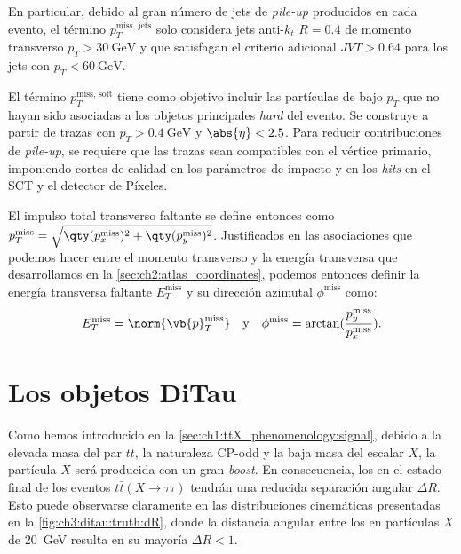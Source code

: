 En particular, debido al gran número de jets de \textit{pile-up} producidos en cada evento, el término $p_T^{\text{miss, jets}}$ solo considera jets anti-$k_t$ $R = 0.4$ de momento transverso $p_T > \SI{30}{\GeV}$ y que satisfagan el criterio adicional $JVT > 0.64$ para los jets con $p_T < \SI{60}{\GeV}$.

El término $p_T^{\text{miss, soft}}$ tiene como objetivo incluir las partículas de bajo $p_T$ que no hayan sido asociadas a los objetos principales \textit{hard} del evento. Se construye a partir de trazas con $p_T > \SI{0.4}{\GeV}$ y $\abs{\eta} < 2.5$. Para reducir contribuciones de \textit{pile-up}, se requiere que las trazas sean compatibles con el vértice primario, imponiendo cortes de calidad en los parámetros de impacto y en los \textit{hits} en el SCT y el detector de Píxeles.

El impulso total transverso faltante se define entonces como $p_T^{\text{miss}} = \sqrt{\qty(p_x^{\text{miss}})^2 + \qty(p_y^{\text{miss}})^2}$. Justificados en las asociaciones que podemos hacer entre el momento transverso y la energía transversa que desarrollamos en la \cref{sec:ch2:atlas_coordinates}, podemos entonces definir la energía transversa faltante $E_T^{\text{miss}}$ y su dirección azimutal $\phi^{\text{miss}}$ como:
\[ E_T^{\text{miss}} = \norm{\vb{p}_T^{\text{miss}}} \quad \text{y} \quad \phi^{\text{miss}} = \arctan(\frac{p_y^{\text{miss}}}{p_x^{\text{miss}}}). \]






\section{Los objetos DiTau} \label{sec:ch3:ditaus}

Como hemos introducido en la \cref{sec:ch1:ttX_phenomenology:signal}, debido a la elevada masa del par $t\bar{t}$, la naturaleza CP-odd y la baja masa del escalar $X$, la partícula $X$ será producida con un gran \textit{boost}. En consecuencia, los \ttaus en el estado final de los eventos $t\bar{t}(X\to\tau\tau)$ tendrán una reducida separación angular $\Delta R$. Esto puede observarse claramente en las distribuciones cinemáticas presentadas en la \cref{fig:ch3:ditau:truth:dR}, donde la distancia angular entre los \thad en partículas $X$ de \SI{20}{\GeV} resulta en su mayoría $\Delta R < 1$. 

